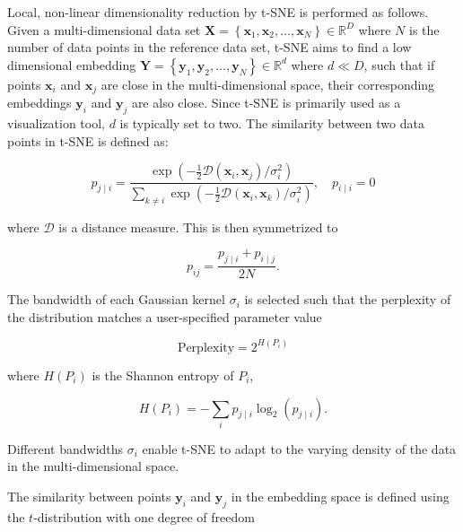 \documentclass[twocolumn]{bmcart}
\begin{document}
Local, non-linear dimensionality reduction by t-SNE is performed as follows.
Given a multi-dimensional data set $\mathbf{X} = \left \{ \mathbf{x}_1,
\mathbf{x}_2, \dots, \mathbf{x}_N \right \} \in \mathbb{R}^D$ where $N$ is the
number of data points in the reference data set, t-SNE aims to find a low
dimensional embedding $\mathbf{Y} = \left \{ \mathbf{y}_1, \mathbf{y}_2, \dots,
\mathbf{y}_N \right \} \in \mathbb{R}^d$ where $d \ll D$, such that if points
$\mathbf{x}_i$ and $\mathbf{x}_j$ are close in the multi-dimensional space,
their corresponding embeddings $\mathbf{y}_i$ and $\mathbf{y}_j$ are also
close. Since t-SNE is primarily used as a visualization tool, $d$ is typically
set to two. The similarity between two data points in t-SNE is defined as:

\begin{equation}
p_{j \mid i} = \frac{\exp \left ( -\frac{1}{2} \mathcal{D}(\mathbf{x}_i, \mathbf{x}_j ) / \sigma_i^2 \right )}
{\sum_{k \neq i } \exp \left ( -\frac{1}{2} \mathcal{D}(\mathbf{x}_i, \mathbf{x}_k ) / \sigma_i^2 \right )}, \quad p_{i \mid i} = 0
\label{eq:gaussian_kernel}
\end{equation}

\noindent where $\mathcal{D}$ is a distance measure. This is then symmetrized to

\begin{equation}
p_{ij} = \frac{p_{j \mid i} + p_{i \mid j}}{2N}.
\label{eq:symmetrize}
\end{equation}

The bandwidth of each Gaussian kernel $\sigma_i$ is selected such that the
perplexity of the distribution matches a user-specified parameter value

\begin{equation}
\text{Perplexity} = 2^{H(P_i)}
\end{equation}

\noindent where $H(P_i)$ is the Shannon entropy of $P_i$,

\begin{equation}
H(P_i) = -\sum_i p_{j \mid i} \log_2 (p_{j \mid i}).
\end{equation}

\noindent Different bandwidths $\sigma_i$ enable t-SNE to adapt to the varying
density of the data in the multi-dimensional space.

The similarity between points $\mathbf{y}_i$ and $\mathbf{y}_j$ in the
embedding space is defined using the $t$-distribution with one degree of
freedom
\end{document}
